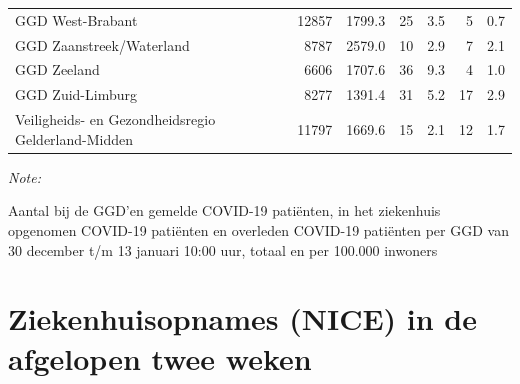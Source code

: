 \documentclass[
  english,
  man,floatsintext]{apa6}
\begin{document}
\begin{table}
\begin{threeparttable}
\begin{tabular}{lrrrrrr}
GGD West-Brabant & 12857 & 1799.3 & 25 & 3.5 & 5 & 0.7\\
GGD Zaanstreek/Waterland & 8787 & 2579.0 & 10 & 2.9 & 7 & 2.1\\
GGD Zeeland & 6606 & 1707.6 & 36 & 9.3 & 4 & 1.0\\
GGD Zuid-Limburg & 8277 & 1391.4 & 31 & 5.2 & 17 & 2.9\\
Veiligheids- en Gezondheidsregio Gelderland-Midden & 11797 & 1669.6 & 15 & 2.1 & 12 & 1.7\\
\bottomrule
\end{tabular}
\begin{tablenotes}
\item \textit{Note: } 
\item Aantal bij de GGD’en gemelde COVID-19 patiënten, in het ziekenhuis opgenomen COVID-19 patiënten en overleden COVID-19 patiënten per GGD van 30 december t/m 13 januari 10:00 uur, totaal en per 100.000 inwoners
\end{tablenotes}
\end{threeparttable}
\endgroup{}
\end{table}

\newpage

\hypertarget{ziekenhuisopnames-nice-in-de-afgelopen-twee-weken}{%
\section{Ziekenhuisopnames (NICE) in de afgelopen twee weken}\label{ziekenhuisopnames-nice-in-de-afgelopen-twee-weken}}
\end{document}
